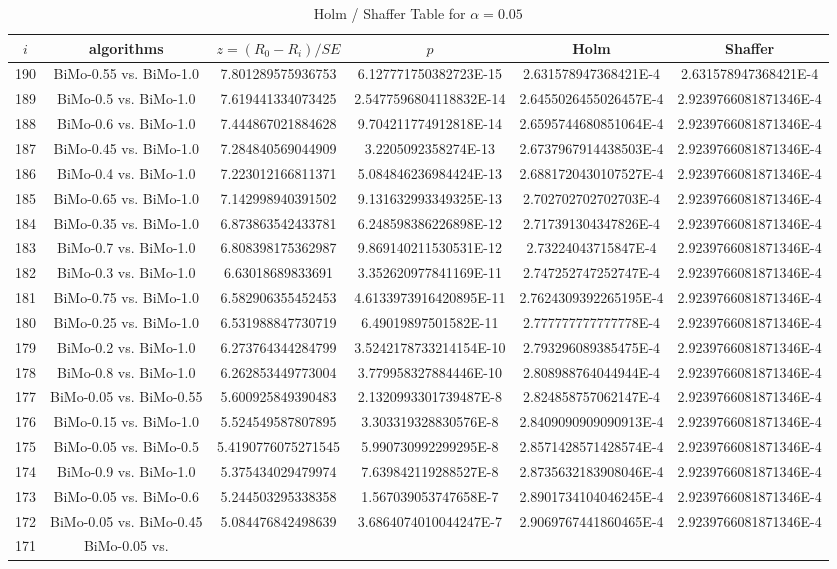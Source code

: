 \documentclass[a4paper,10pt]{article}
\begin{document}
\begin{landscape}
\begin{table}[!htp]
\centering\tiny
\caption{Holm / Shaffer Table for $\alpha=0.05$}
\begin{tabular}{cccccc}
$i$&algorithms&$z=(R_0 - R_i)/SE$&$p$&Holm&Shaffer\\
\hline
190&BiMo-0.55 vs. BiMo-1.0&7.801289575936753&6.127771750382723E-15&2.631578947368421E-4&2.631578947368421E-4\\189&BiMo-0.5 vs. BiMo-1.0&7.619441334073425&2.5477596804118832E-14&2.6455026455026457E-4&2.9239766081871346E-4\\188&BiMo-0.6 vs. BiMo-1.0&7.444867021884628&9.704211774912818E-14&2.6595744680851064E-4&2.9239766081871346E-4\\187&BiMo-0.45 vs. BiMo-1.0&7.284840569044909&3.2205092358274E-13&2.6737967914438503E-4&2.9239766081871346E-4\\186&BiMo-0.4 vs. BiMo-1.0&7.223012166811371&5.084846236984424E-13&2.6881720430107527E-4&2.9239766081871346E-4\\185&BiMo-0.65 vs. BiMo-1.0&7.142998940391502&9.131632993349325E-13&2.702702702702703E-4&2.9239766081871346E-4\\184&BiMo-0.35 vs. BiMo-1.0&6.873863542433781&6.248598386226898E-12&2.717391304347826E-4&2.9239766081871346E-4\\183&BiMo-0.7 vs. BiMo-1.0&6.808398175362987&9.869140211530531E-12&2.73224043715847E-4&2.9239766081871346E-4\\182&BiMo-0.3 vs. BiMo-1.0&6.63018689833691&3.352620977841169E-11&2.747252747252747E-4&2.9239766081871346E-4\\181&BiMo-0.75 vs. BiMo-1.0&6.582906355452453&4.6133973916420895E-11&2.7624309392265195E-4&2.9239766081871346E-4\\180&BiMo-0.25 vs. BiMo-1.0&6.531988847730719&6.49019897501582E-11&2.777777777777778E-4&2.9239766081871346E-4\\179&BiMo-0.2 vs. BiMo-1.0&6.273764344284799&3.5242178733214154E-10&2.793296089385475E-4&2.9239766081871346E-4\\178&BiMo-0.8 vs. BiMo-1.0&6.262853449773004&3.779958327884446E-10&2.808988764044944E-4&2.9239766081871346E-4\\177&BiMo-0.05 vs. BiMo-0.55&5.600925849390483&2.1320993301739487E-8&2.824858757062147E-4&2.9239766081871346E-4\\176&BiMo-0.15 vs. BiMo-1.0&5.524549587807895&3.303319328830576E-8&2.8409090909090913E-4&2.9239766081871346E-4\\175&BiMo-0.05 vs. BiMo-0.5&5.4190776075271545&5.990730992299295E-8&2.8571428571428574E-4&2.9239766081871346E-4\\174&BiMo-0.9 vs. BiMo-1.0&5.375434029479974&7.639842119288527E-8&2.8735632183908046E-4&2.9239766081871346E-4\\173&BiMo-0.05 vs. BiMo-0.6&5.244503295338358&1.567039053747658E-7&2.8901734104046245E-4&2.9239766081871346E-4\\172&BiMo-0.05 vs. BiMo-0.45&5.084476842498639&3.6864074010044247E-7&2.9069767441860465E-4&2.9239766081871346E-4\\171&BiMo-0.05 vs. 
\end{tabular}
\end{table}
\end{landscape}
\end{document}
